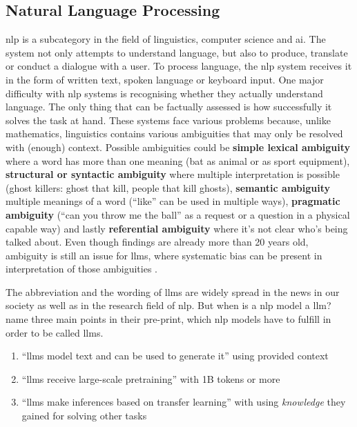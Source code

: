 \subsection{Natural Language Processing}
\acrfull{nlp} is a subcategory in the field of linguistics, computer science and \acrshort{ai}. The system not only attempts to understand language, but also to produce, translate or conduct a dialogue with a user. To process language, the \acrshort{nlp} system receives it in the form of written text, spoken language or keyboard input. One major difficulty with \acrshort{nlp} systems is recognising whether they actually understand language. The only thing that can be factually assessed is how successfully it solves the task at hand.
These systems face various problems because, unlike mathematics, linguistics contains various ambiguities that may only be resolved with (enough) context. Possible ambiguities could be \textbf{simple lexical ambiguity} where a word has more than one meaning (bat as animal or as sport equipment), \textbf{structural or syntactic ambiguity} where multiple interpretation is possible (ghost killers: ghost that kill, people that kill ghosts), \textbf{semantic ambiguity} multiple meanings of a word (\enquote{like} can be used in multiple ways), \textbf{pragmatic ambiguity} (\enquote{can you throw me the ball} as a request or a question in a physical capable way) and lastly \textbf{referential ambiguity} where it's not clear who's being talked about. Even though \citet{allen-nlp} findings are already more than 20 years old, ambiguity is still an issue for \acrshort{llms}, where systematic bias can be present in interpretation of those ambiguities \citep{ambiguity}.

The abbreviation and the wording of \acrshort{llms} are widely spread in the news in our society as well as in the research field of \acrshort{nlp}. But when is a \acrshort{nlp} model a \acrshort{llm}? 
\citet{luccioni} name three main points in their pre-print, which \acrshort{nlp} models have to fulfill in order to be called \acrshort{llms}. 
\begin{enumerate}
    \item \enquote{\acrshort{llms} model text and can be used to generate it} using provided context 
    \item \enquote{\acrshort{llms} receive large-scale pretraining} with  1B tokens or more
    \item \enquote{\acrshort{llms} make inferences based on transfer learning} with using \textit{knowledge} they gained for solving other tasks
\end{enumerate}

